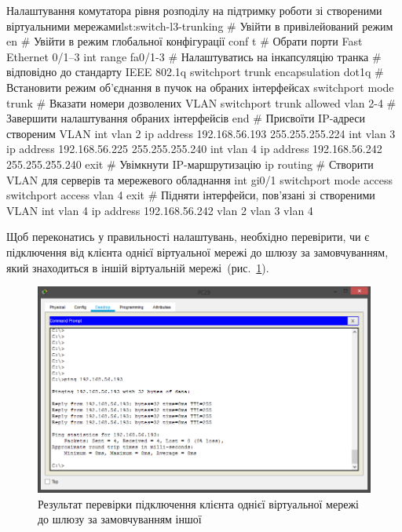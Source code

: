 \documentclass[
  ukrainian,
  simple,
  floatsection,
]{eskdnaukvd}
\newlength{\gridunitwidth}
\begin{document}
      \begin{listingplaintext}{Налаштування комутатора рівня розподілу на підтримку роботи зі створеними віртуальними мережами}{lst:switch-l3-trunking}
        # Увійти в привілейований режим
        en
        # Увійти в режим глобальної конфігурації
        conf t
        # Обрати порти Fast Ethernet 0/1–3
        int range fa0/1-3
        # Налаштуватись на інкапсуляцію транка
        # відповідно до стандарту IEEE 802.1q
        switchport trunk encapsulation dot1q
        # Встановити режим об'єднання в пучок на обраних інтерфейсах
        switchport mode trunk
        # Вказати номери дозволених VLAN
        switchport trunk allowed vlan 2-4
        # Завершити налаштування обраних інтерфейсів
        end
        # Присвоїти IP-адреси створеним VLAN
        int vlan 2
        ip address 192.168.56.193 255.255.255.224
        int vlan 3
        ip address 192.168.56.225 255.255.255.240
        int vlan 4
        ip address 192.168.56.242 255.255.255.240
        exit
        # Увімкнути IP-маршрутизацію
        ip routing
        # Створити VLAN для серверів та мережевого обладнання
        int gi0/1
        switchport mode access
        switchport access vlan 4
        exit
        # Підняти інтерфейси, пов'язані зі створеними VLAN
        int vlan 4
        ip address 192.168.56.242
        vlan 2
        vlan 3
        vlan 4
      \end{listingplaintext}

      Щоб переконатись у правильності налаштувань, необхідно перевірити, чи є підключення від клієнта однієї віртуальної мережі до шлюзу за замовчуванням, який знаходиться в іншій віртуальній мережі~(рис.~\ref{fig:switch-l3-ping}).

      \begin{figure}[!htbp]
        \centering
        \includegraphics[width = 6.5 \gridunitwidth]{./assets/10-switch-l3-ping.png}
        \caption{Результат перевірки підключення клієнта однієї віртуальної мережі до шлюзу за замовчуванням іншої}
        \label{fig:switch-l3-ping}
      \end{figure}
\end{document}
